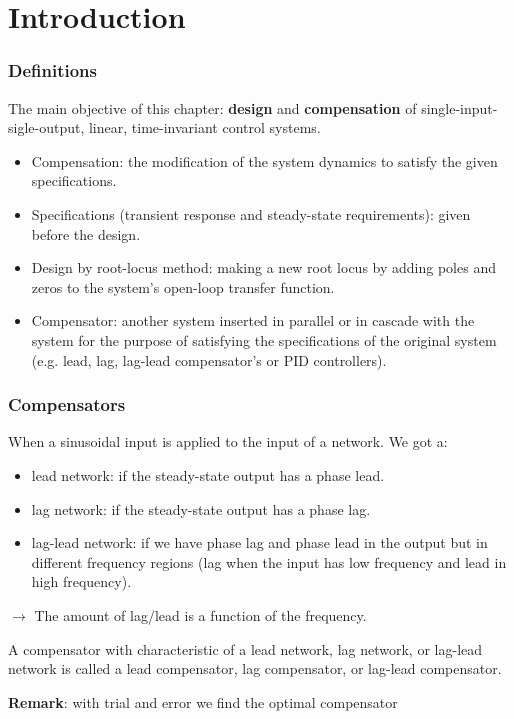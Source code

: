 \section{Introduction}

\begin{frame}
	\frametitle{Definitions}
		The main objective of this chapter: \textbf{design} and \textbf{compensation} of single-input-sigle-output, linear, time-invariant control systems.
		\begin{itemize}
			\item Compensation: the modification of the system dynamics to satisfy the given specifications.
			\item Specifications (transient response and steady-state requirements): given before the design.
			\item Design by root-locus method: making a new root locus by adding poles and zeros to the system's open-loop transfer function.
			\item Compensator: another system inserted in parallel or in cascade with the system for the purpose of satisfying the specifications of the original system (e.g. lead, lag, lag-lead compensator's or PID controllers).
		\end{itemize}
\end{frame}

\begin{frame}
	\frametitle{Compensators}
	When a sinusoidal input is applied to the input of a network. We got a:
	\begin{itemize}
		\item lead network: if the steady-state output has a phase lead.
		\item lag network: if the steady-state output has a phase lag.
		\item lag-lead network: if we have phase lag and phase lead in the output but in different frequency regions (lag when the input has low frequency and lead in high frequency). 
	\end{itemize}
	$\rightarrow$ The amount of lag/lead is a function of the frequency. \vspace{4mm}
	
	A compensator with characteristic of a lead network, lag network, or lag-lead network is called a lead compensator, lag compensator, or lag-lead compensator. 
	
	\textbf{Remark}: with trial and error we find the optimal compensator
\end{frame}

